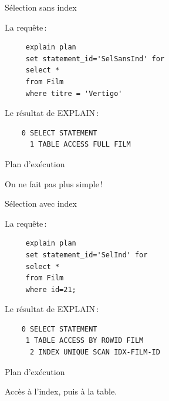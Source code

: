 \begin{frame}[fragile]{Sélection sans index}

La requête\,:

\begin{verbatim}
     explain plan 
     set statement_id='SelSansInd' for
     select *
     from Film
     where titre = 'Vertigo' 
\end{verbatim}

\vfill

Le résultat de EXPLAIN\,:
\begin{verbatim}
    0 SELECT STATEMENT
      1 TABLE ACCESS FULL FILM   
\end{verbatim}

\end{frame}

\begin{frame}{Plan d'exécution}

On ne fait pas plus simple\,!


\end{frame}

\begin{frame}[fragile]{Sélection avec index}

La requête\,:

\begin{verbatim}
     explain plan 
     set statement_id='SelInd' for
     select *
     from Film
     where id=21;
\end{verbatim}

\vfill

Le résultat de EXPLAIN\,:
\begin{verbatim}
    0 SELECT STATEMENT
     1 TABLE ACCESS BY ROWID FILM
      2 INDEX UNIQUE SCAN IDX-FILM-ID 
\end{verbatim}

\end{frame}


\begin{frame}{Plan d'exécution}

Accès à l'index, puis à la table.


\end{frame}


